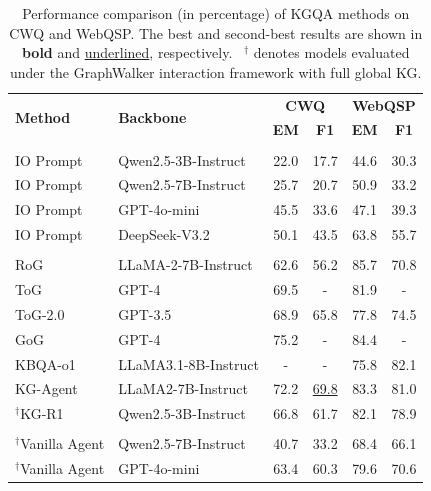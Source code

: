 \begin{table}[t]
  \centering
  \scriptsize
  \caption{Performance comparison (in percentage) of KGQA methods on CWQ and WebQSP. The best and second-best results are shown in \textbf{bold} and \underline{underlined}, respectively.~ ${}^{\dagger}$ denotes models evaluated under the GraphWalker interaction framework with full global KG.}
  \vspace{-6pt}
  \label{tab:main-results}
  \setlength{\tabcolsep}{10pt}
  \renewcommand{\arraystretch}{1.1}
  \begin{tabular}{l|l|cc|cc}
  \toprule
  \multirow{2}{*}{\textbf{Method}}
  & \multirow{2}{*}{\textbf{Backbone}}
  & \multicolumn{2}{c|}{\textbf{CWQ}}
  & \multicolumn{2}{c}{\textbf{WebQSP}} \\
  & & \textbf{EM} & \textbf{F1} & \textbf{EM} & \textbf{F1} \\
  \midrule
  \rowcolor{gray!15}
  \multicolumn{6}{c}{\textit{Vanilla LLMs}} \\
  \midrule
  IO Prompt & Qwen2.5-3B-Instruct & 22.0 & 17.7 & 44.6 & 30.3 \\
  IO Prompt & Qwen2.5-7B-Instruct & 25.7 & 20.7 & 50.9 & 33.2 \\
  IO Prompt & GPT-4o-mini & 45.5 & 33.6 & 47.1 & 39.3 \\
  IO Prompt & DeepSeek-V3.2 & 50.1 & 43.5 & 63.8 & 55.7 \\
  \midrule
  \rowcolor{gray!15}
  \multicolumn{6}{c}{\textit{Agentic KGQA Methods}} \\
  \midrule
  RoG & LLaMA-2-7B-Instruct & 62.6 & 56.2 & 85.7 & 70.8 \\
  ToG & GPT-4 & 69.5 & - & 81.9 & - \\
  ToG-2.0 & GPT-3.5 & 68.9 & 65.8 & 77.8 & 74.5 \\
  GoG & GPT-4 & 75.2 & - & 84.4 & - \\
  KBQA-o1 & LLaMA3.1-8B-Instruct& - & - & 75.8 & 82.1 \\
  KG-Agent & LLaMA2-7B-Instruct & 72.2 & \underline{69.8} & 83.3 & 81.0 \\
  ${}^{\dagger}$KG-R1 & Qwen2.5-3B-Instruct & 66.8 & 61.7 & 82.1 & 78.9 \\
  \midrule
  \rowcolor{gray!15}
  \multicolumn{6}{c}{\textit{GraphWalker (Our Method)}} \\
  \midrule
  ${}^{\dagger}$Vanilla Agent
    & Qwen2.5-7B-Instruct
    & 40.7 & 33.2
    & 68.4 & 66.1 \\
  ${}^{\dagger}$Vanilla Agent
    & GPT-4o-mini
    & 63.4 & 60.3
    & 79.6 & 70.6 \\

\end{tabular}
\end{table}
